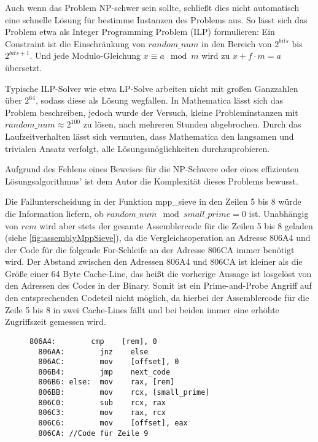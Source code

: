 Auch wenn das Problem NP-schwer sein sollte, schließt dies nicht automatisch eine schnelle Lösung für bestimme Instanzen des Problems aus.
So lässt sich das Problem etwa als Integer Programming Problem (ILP) formulieren:
Ein Constraint ist die Einschränkung von $random\_num$ in den Bereich von $2^{bits}$ bis $2^{bits+1}$.
Und jede Modulo-Gleichung $x \equiv a \mod m$ wird zu $x + f \cdot m = a$ übersetzt.

Typische ILP-Solver wie etwa LP-Solve \cite{lpsolve} arbeiten nicht mit großen Ganzzahlen über $2^64$, sodass diese als Lösung wegfallen.
In Mathematica \cite{Mathematica} lässt sich das Problem beschreiben, jedoch wurde der Versuch, kleine Probleminstanzen mit $random\_num \approx 2^100$ zu lösen, nach mehreren Stunden abgebrochen.
Durch das Laufzeitverhalten lässt sich vermuten, dass Mathematica den langsamen und trivialen Ansatz verfolgt, alle Lösungsmöglichkeiten durchzuprobieren.

Aufgrund des Fehlens eines Beweises für die NP-Schwere oder eines effizienten Lösungsalgorithmus' ist dem Autor die Komplexität dieses Problems bewusst.

Die Fallunterscheidung in der Funktion mpp_sieve in den Zeilen 5 bis 8 würde die Information liefern, ob $random\_num \mod small\_prime = 0$ ist.
Unabhängig von $rem$ wird aber stets der gesamte Assemblercode für die Zeilen 5 bis 8 geladen (siehe \ref{fig:assemblyMppSieve}), da die Vergleichsoperation an Adresse 806A4 und der Code für die folgende For-Schleife an der Adresse 806CA immer benötigt wird.
Der Abstand zwischen den Adressen 806A4 und 806CA ist kleiner als die Größe einer 64 Byte Cache-Line, das heißt die vorherige Aussage ist losgelöst von den Adressen des Codes in der Binary.
Somit ist ein Prime-and-Probe Angriff auf den entsprechenden Codeteil nicht möglich, da hierbei der Assemblercode für die Zeile 5 bis 8 in zwei Cache-Lines fällt und bei beiden immer eine erhöhte Zugriffszeit gemessen wird.

\begin{figure}[h]
\begin{lstlisting}[caption={Assemblercode für die Zeilen 5 bis 8 der Funktion mpp_sieve, welche Teile des Codes der RSA-Primzahlgenerierung für Mozilla NSS ist.},label=fig:assemblyMppSieve]
  806A4:        cmp    [rem], 0
  806AA:        jnz    else
  806AC:        mov    [offset], 0  
  806B4:        jmp    next_code
  806B6: else:  mov    rax, [rem]
  806BB:        mov    rcx, [small_prime]
  806C0:        sub    rcx, rax
  806C3:        mov    rax, rcx
  806C6:        mov    [offset], eax
  806CA: //Code für Zeile 9
\end{lstlisting}
\end{figure}

